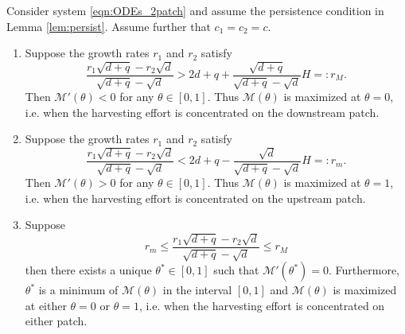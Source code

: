 \documentclass[10pt,a4paper]{amsart}
\def\MM{\mathcal{M}}
\begin{document}
\begin{theorem}\label{theorem:M'}
 Consider system \eqref{eqn:ODEs_2patch} and assume the persistence condition in Lemma \ref{lem:persist}. Assume further that $c_1=c_2=c$.
    \begin{enumerate}
        \item[(a)] Suppose the growth rates $r_1$ and $r_2$ satisfy 
        \[\frac{r_1\sqrt{d+q}-r_2\sqrt{d}}{\sqrt{d+q}-\sqrt{d}}> 2d+q +\frac{\sqrt{d+q}}{\sqrt{d+q}-\sqrt{d}}H=:r_M.\]
        Then $\MM'(\theta)< 0$ for any $\theta\in[0,1]$. Thus $\MM(\theta)$ is maximized at $\theta=0$, i.e. when the harvesting effort is concentrated on the downstream patch.
        \item[(b)]  Suppose the growth rates $r_1$ and $r_2$ satisfy 
        \[\frac{r_1\sqrt{d+q}-r_2\sqrt{d}}{\sqrt{d+q}-\sqrt{d}}< 2d+q -\frac{\sqrt{d}}{\sqrt{d+q}-\sqrt{d}}H=:r_m.\]
        Then $\MM'(\theta)> 0$ for any $\theta\in[0,1]$. Thus $\MM(\theta)$ is maximized at $\theta=1$, i.e. when the harvesting effort is concentrated on the upstream patch.
        \item[(c)] Suppose 
        \[
        r_m\leq \frac{r_1\sqrt{d+q}-r_2\sqrt{d}}{\sqrt{d+q}-\sqrt{d}}\leq r_M
        \]
        then there exists a unique $\theta^*\in[0,1]$ such that $\MM'(\theta^*)=0$. Furthermore, $\theta^*$ is a minimum of $\MM(\theta)$ in the interval $[0,1]$ and $\MM(\theta)$ is maximized at either $\theta=0$ or $\theta=1$, i.e. when the harvesting effort is concentrated  on either patch.
        \end{enumerate}
\end{theorem}
\end{document}

